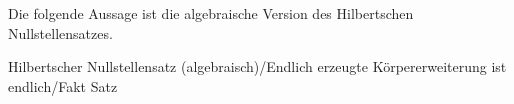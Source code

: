 Die folgende Aussage ist die algebraische Version des Hilbertschen Nullstellensatzes.



{Hilbertscher Nullstellensatz (algebraisch)/Endlich erzeugte Körpererweiterung ist endlich/Fakt}
{Satz}
{}
{



\faktsituation {}
\faktzusatz {}
\faktzusatz {}





}
